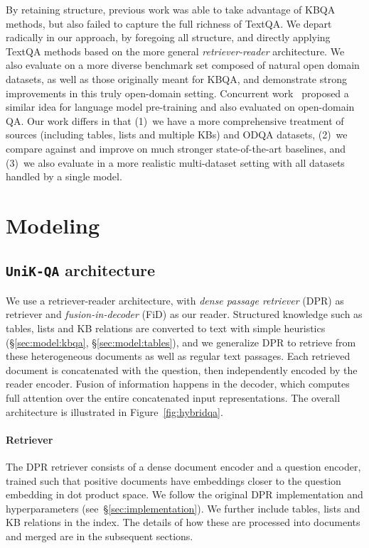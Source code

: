 \documentclass[11pt]{article}
\newcommand{\uniqa}{\texttt{UniK-QA}\xspace}
\newcommand{\secref}[1]{\S\ref{#1}}
\begin{document}
By retaining structure, previous work was able to take advantage of KBQA methods, but also failed to capture the full richness of TextQA.  We depart radically in our approach, by foregoing all structure, and directly applying TextQA methods based on the more general \emph{retriever-reader} architecture.  We also evaluate on a more diverse benchmark set composed of natural open domain datasets, as well as those originally meant for KBQA, and demonstrate strong improvements in this truly open-domain setting.
Concurrent work~\citep{agarwal-etal-2021-knowledge} proposed a similar idea for language model pre-training and also evaluated on open-domain QA.  Our work differs in that (1)~we have a more comprehensive treatment of sources (including tables, lists and multiple KBs) and ODQA datasets, (2)~we compare against and improve on much stronger state-of-the-art baselines, and (3)~we also evaluate in a more realistic multi-dataset setting with all datasets handled by a single model.






 
\section{Modeling}

\subsection{\uniqa{} architecture}
We use a retriever-reader architecture, with \emph{dense passage retriever} (DPR) \citep{DPR} as retriever and \emph{fusion-in-decoder} (FiD) \citep{izacard-grave-2021-leveraging} as our reader.  
Structured knowledge such as tables, lists and KB relations are converted to text with simple heuristics (\secref{sec:model:kbqa}, \secref{sec:model:tables}), and we generalize DPR to retrieve from these heterogeneous documents as well as regular text passages.
Each retrieved document is concatenated with the question, then independently encoded by the reader encoder.  Fusion of information happens in the decoder, which computes full attention over the entire concatenated input representations.  The overall architecture is illustrated in Figure~\ref{fig:hybridqa}.

\paragraph{Retriever}
The DPR retriever consists of a dense document encoder and a question encoder, trained such that positive documents have embeddings closer to the question embedding in dot product space.  We follow the original DPR implementation and hyperparameters (see~\secref{sec:implementation}).
We further include tables, lists and KB relations in the index.  The details of how these are processed into documents and merged are in the subsequent sections.
\end{document}
